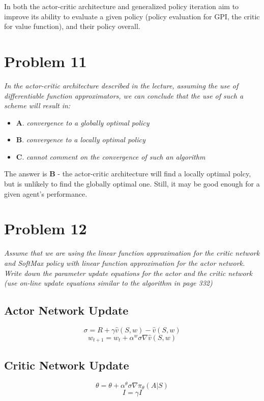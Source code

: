 \documentclass{article}
\begin{document}
In both the actor-critic architecture and generalized policy iteration aim to improve its ability to evaluate a given policy (policy evaluation for GPI, the critic for value function), and their policy overall.

\section*{Problem 11}
\textit{In the actor-critic architecture described in the lecture, assuming the use of differentiable
function approximators, we can conclude that the use of such a scheme will result in:}
\begin{itemize}
    \item \textbf{A}. \textit{convergence to a globally optimal policy}
    \item \textbf{B}. \textit{convergence to a locally optimal policy}
    \item \textbf{C}. \textit{cannot comment on the convergence of such an algorithm}
\end{itemize}

The answer is \textbf{B} - the actor-critic architecture will find a locally optimal polcy, but is unlikely to find the globally optimal one. Still, it may be good enough for a given agent's performance.

\section*{Problem 12}
\textit{Assume that we are using the linear function approximation for the critic network and SoftMax policy with linear function approximation for the actor network. Write down the parameter update equations for the actor and the critic network (use on-line update equations similar to the algorithm in page 332)}

\subsection{Actor Network Update}
\begin{equation}
    \sigma = R + \gamma \hat{v} (S,w) - \hat{v} (S,w)
\end{equation}
\begin{equation}
    w_{t+1} = w_t + \alpha^w \sigma \nabla \hat{v} (S,w)
\end{equation}

\subsection{Critic Network Update}
\begin{equation}
    \theta = \theta + \alpha^\theta \sigma \nabla \pi_\theta (A | S)
\end{equation}
\begin{equation}
    I = \gamma I
\end{equation}
\end{document}
